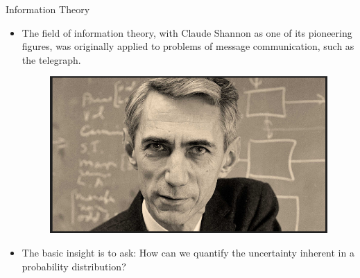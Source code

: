 \documentclass[handout]{beamer}
\begin{document}
\begin{frame}{Information Theory}
\scriptsize{

\begin{itemize}

\item  The field of information theory, with Claude Shannon as one of its pioneering figures, was originally applied to problems of message communication, such as the telegraph.

\begin{figure}[h!]
	\centering
	\includegraphics[scale=0.2]{pics/shannon.png}
\end{figure}
\vspace{3mm}

\item The basic insight is to ask: How can we quantify the uncertainty inherent in a probability distribution?

\end{itemize}


} 
\end{frame}
\end{document}
